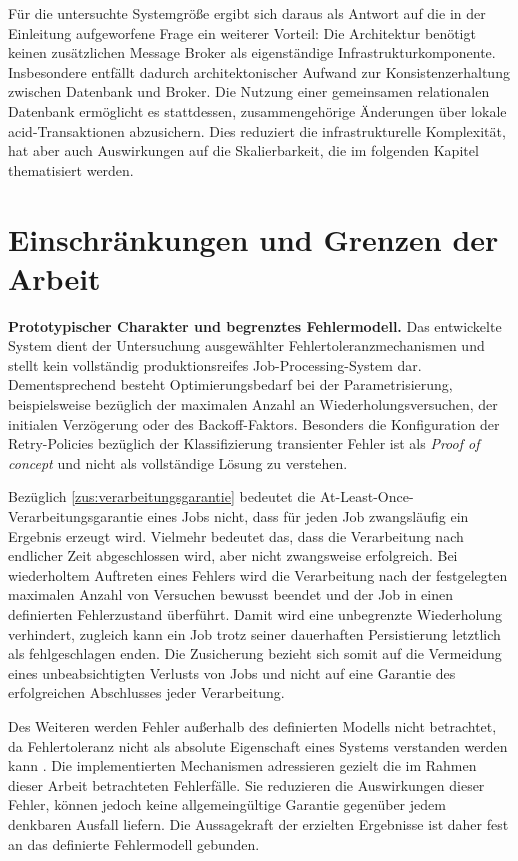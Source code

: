 Für die untersuchte Systemgröße ergibt sich daraus als Antwort auf die in der Einleitung aufgeworfene Frage ein weiterer Vorteil:
Die Architektur benötigt keinen zusätzlichen Message Broker als eigenständige Infrastrukturkomponente.
Insbesondere entfällt dadurch architektonischer Aufwand zur Konsistenzerhaltung zwischen Datenbank und Broker.
Die Nutzung einer gemeinsamen relationalen Datenbank ermöglicht es stattdessen, zusammengehörige Änderungen über lokale
\gls{acid}-Transaktionen abzusichern.
Dies reduziert die infrastrukturelle Komplexität, hat aber auch Auswirkungen auf die Skalierbarkeit, die im folgenden Kapitel
thematisiert werden.

\section{Einschränkungen und Grenzen der Arbeit}
\label{sec:einschraenkungen}
\textbf{Prototypischer Charakter und begrenztes Fehlermodell.}
Das entwickelte System dient der Untersuchung ausgewählter Fehlertoleranzmechanismen und stellt kein vollständig
produktionsreifes Job-Processing-System dar.
Dementsprechend besteht Optimierungsbedarf bei der Parametrisierung, beispielsweise bezüglich der maximalen Anzahl an Wiederholungsversuchen,
der initialen Verzögerung oder des Backoff-Faktors.
Besonders die Konfiguration der Retry-Policies bezüglich der Klassifizierung transienter Fehler ist als \textit{Proof of concept}
und nicht als vollständige Lösung zu verstehen.

Bezüglich \ref{zus:verarbeitungsgarantie} bedeutet die At-Least-Once-Verarbeitungsgarantie eines Jobs nicht, dass für jeden Job zwangsläufig
ein Ergebnis erzeugt wird.
Vielmehr bedeutet das, dass die Verarbeitung nach endlicher Zeit abgeschlossen wird, aber nicht zwangsweise erfolgreich.
Bei wiederholtem Auftreten eines Fehlers wird die Verarbeitung nach der festgelegten maximalen Anzahl von Versuchen bewusst
beendet und der Job in einen definierten Fehlerzustand überführt.
Damit wird eine unbegrenzte Wiederholung verhindert, zugleich kann ein Job trotz seiner dauerhaften Persistierung letztlich als fehlgeschlagen enden.
Die Zusicherung bezieht sich somit auf die Vermeidung eines unbeabsichtigten Verlusts von Jobs und nicht auf eine Garantie
des erfolgreichen Abschlusses jeder Verarbeitung.

Des Weiteren werden Fehler außerhalb des definierten Modells nicht betrachtet, da Fehlertoleranz nicht als absolute Eigenschaft
eines Systems verstanden werden kann \parencite[Kap.~1 Abschnitt \glqq Reliability\grqq]{kleppmann_designing_2017}.
Die implementierten Mechanismen adressieren gezielt die im Rahmen dieser Arbeit betrachteten Fehlerfälle.
Sie reduzieren die Auswirkungen dieser Fehler, können jedoch keine allgemeingültige Garantie gegenüber jedem denkbaren Ausfall liefern.
Die Aussagekraft der erzielten Ergebnisse ist daher fest an das definierte Fehlermodell gebunden.

